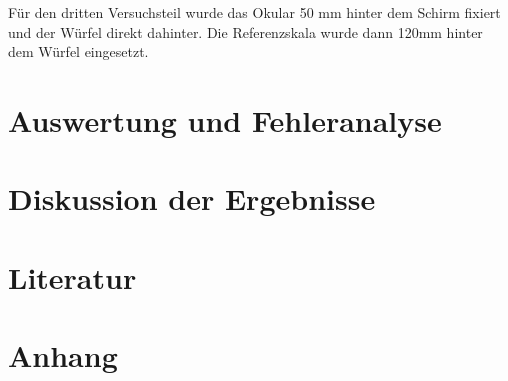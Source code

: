 \documentclass[11pt,a4paper]{article}
\begin{document}
Für den dritten Versuchsteil wurde das Okular 50 mm hinter dem Schirm fixiert und der Würfel direkt dahinter. Die Referenzskala wurde dann 120mm hinter dem Würfel eingesetzt. 


\section{Auswertung und Fehleranalyse}

\section{Diskussion der Ergebnisse}

\section{Literatur}

\section{Anhang}
\end{document}
